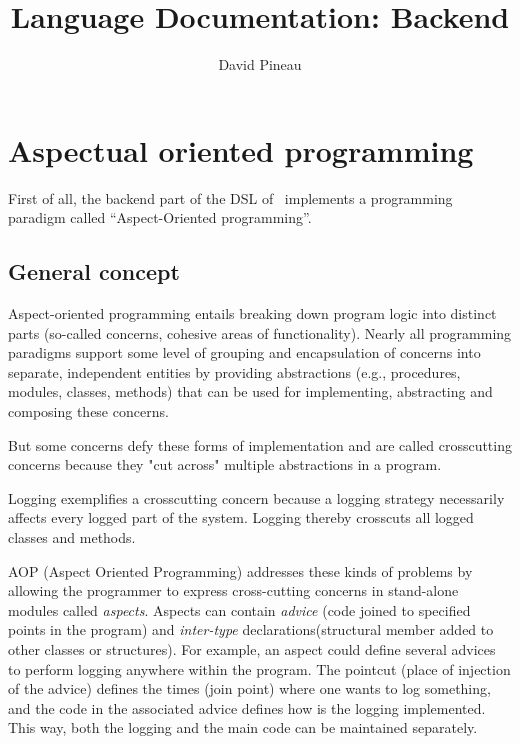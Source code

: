\documentclass[american]{rtxreport}
\author{David Pineau}
\title{Language Documentation: Backend}
\begin{document}
\maketitle

\rtxmaketitleblock

\tableofcontents


\chapter{Aspectual oriented programming}

First of all, the backend part of the DSL of \rtx\ implements a programming
paradigm called ``Aspect-Oriented programming''.

\section{General concept}

Aspect-oriented programming entails breaking down program logic into distinct
parts (so-called concerns, cohesive areas of functionality). Nearly all
programming paradigms support some level of grouping and encapsulation of
concerns into separate, independent entities by providing abstractions (e.g.,
procedures, modules, classes, methods) that can be used for implementing,
abstracting and composing these concerns.

But some concerns defy these forms of implementation and are called
crosscutting concerns because they "cut across" multiple abstractions in a
program.

Logging exemplifies a crosscutting concern because a logging strategy
necessarily affects every logged part of the system. Logging thereby crosscuts
all logged classes and methods.

AOP (Aspect Oriented Programming) addresses these kinds of problems by allowing
the programmer to express cross-cutting concerns in stand-alone modules called
\emph{aspects}. Aspects can contain \emph{advice} (code joined to specified
points in the program) and \emph{inter-type} declarations(structural member
added to other classes or structures). For example, an aspect could define
several advices to perform logging anywhere within the program. The pointcut
(place of injection of the advice) defines the times (join point) where one
wants to log something, and the code in the associated advice defines how is
the logging implemented. This way, both the logging and the main code can be
maintained separately.
\end{document}
